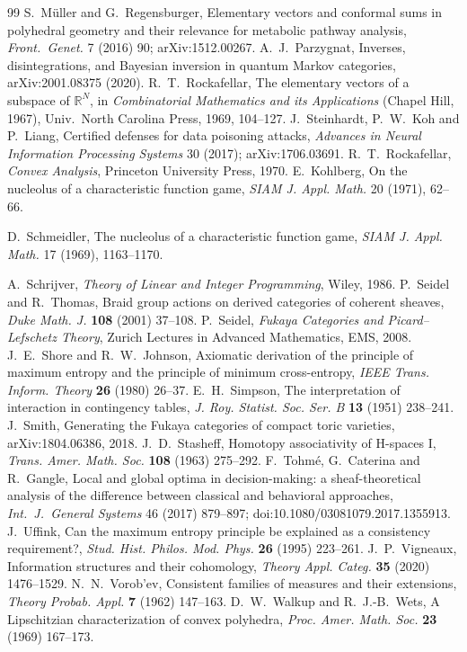 \documentclass[11pt]{article}
\theoremstyle{definition}\newtheorem{definition}[theorem]{Definition}\newtheorem{remark}[theorem]{Remark}\newtheorem{example}[theorem]{Example}\newtheorem{problem}[theorem]{Open problem}\crefname{problem}{Problem}{Problems}
\begin{document}
\begin{thebibliography}{99}
 S.~M\"uller and G.~Regensburger, Elementary vectors and conformal sums in polyhedral geometry and their relevance for metabolic pathway analysis, \emph{Front.\ Genet.} 7 (2016) 90; arXiv:1512.00267.
 A.~J.~Parzygnat, Inverses, disintegrations, and Bayesian inversion in quantum Markov categories, arXiv:2001.08375 (2020).
 R.~T.~Rockafellar, The elementary vectors of a subspace of $\mathbb R^N$, in \emph{Combinatorial Mathematics and its Applications} (Chapel Hill, 1967), Univ.\ North Carolina Press, 1969, 104--127.
 J.~Steinhardt, P.~W.~Koh and P.~Liang, Certified defenses for data poisoning attacks, \emph{Advances in Neural Information Processing Systems} 30 (2017); arXiv:1706.03691.
 R.~T.~Rockafellar, \emph{Convex Analysis}, Princeton University Press, 1970.
 E.~Kohlberg, On the nucleolus of a characteristic function game, \emph{SIAM J. Appl. Math.} 20 (1971), 62--66.

 D.~Schmeidler, The nucleolus of a characteristic function game, \emph{SIAM J. Appl. Math.} 17 (1969), 1163--1170.

 A.~Schrijver, \emph{Theory of Linear and Integer Programming}, Wiley, 1986.
 P.~Seidel and R.~Thomas, Braid group actions on derived categories of coherent sheaves, \emph{Duke Math. J.} \textbf{108} (2001) 37--108.
 P.~Seidel, \emph{Fukaya Categories and Picard--Lefschetz Theory}, Zurich Lectures in Advanced Mathematics, EMS, 2008.
 J.~E.~Shore and R.~W.~Johnson, Axiomatic derivation of the principle of maximum entropy and the principle of minimum cross-entropy, \emph{IEEE Trans. Inform. Theory} \textbf{26} (1980) 26--37.
 E.~H.~Simpson, The interpretation of interaction in contingency tables, \emph{J. Roy. Statist. Soc. Ser. B} \textbf{13} (1951) 238--241.
 J.~Smith, Generating the Fukaya categories of compact toric varieties, arXiv:1804.06386, 2018.
 J.~D.~Stasheff, Homotopy associativity of H-spaces I, \emph{Trans. Amer. Math. Soc.} \textbf{108} (1963) 275--292.
 F.~Tohm\'e, G.~Caterina and R.~Gangle, Local and global optima in decision-making: a sheaf-theoretical analysis of the difference between classical and behavioral approaches, \emph{Int.\ J.\ General Systems} 46 (2017) 879--897; doi:10.1080/03081079.2017.1355913.
 J.~Uffink, Can the maximum entropy principle be explained as a consistency requirement?, \emph{Stud. Hist. Philos. Mod. Phys.} \textbf{26} (1995) 223--261.
 J.~P.~Vigneaux, Information structures and their cohomology, \emph{Theory Appl. Categ.} \textbf{35} (2020) 1476--1529.
 N.~N.~Vorob'ev, Consistent families of measures and their extensions, \emph{Theory Probab. Appl.} \textbf{7} (1962) 147--163.
 D.~W.~Walkup and R.~J.-B.~Wets, A Lipschitzian characterization of convex polyhedra, \emph{Proc. Amer. Math. Soc.} \textbf{23} (1969) 167--173.
\end{thebibliography}
\end{document}
